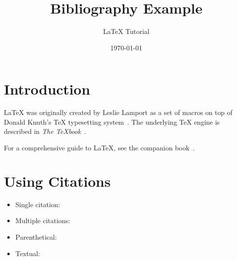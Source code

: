 \documentclass[12pt]{article}
\title{Bibliography Example}
\author{LaTeX Tutorial}
\date{\today}
\begin{document}
\maketitle

\section{Introduction}

\LaTeX{} was originally created by Leslie Lamport as a set of macros on top
of Donald Knuth's \TeX{} typesetting system~\cite{lamport1994latex}.
The underlying \TeX{} engine is described in \textit{The \TeX{}book}~\cite{knuth1984texbook}.

For a comprehensive guide to \LaTeX{}, see the companion book~\cite{mittelbach2004companion}.

\section{Using Citations}

\begin{itemize}
    \item Single citation: \cite{lamport1994latex}
    \item Multiple citations: \cite{knuth1984texbook, mittelbach2004companion}
    \item Parenthetical: \parencite{lamport1994latex}
    \item Textual: \textcite{knuth1984texbook}
\end{itemize}

\printbibliography
\end{document}
